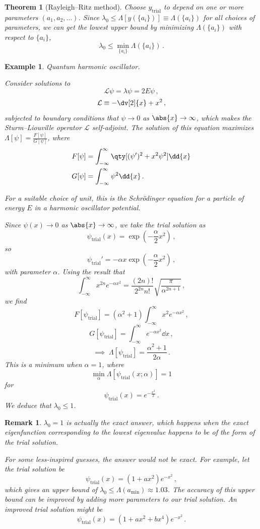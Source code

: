 \documentclass{article}
\theoremstyle{plain}\theoremheaderfont{\normalfont\itshape}\theorembodyfont{\rmfamily}\theoremseparator{.}\newtheorem*{rem}{Remark}\newtheorem*{ex}{Example}\newtheorem*{proof}{Proof}\newtheorem*{altp}{Alternative proof}
\theoremstyle{plain}\theoremheaderfont{\normalfont\bfseries}\theorembodyfont{\rmfamily}\theoremseparator{.}\newtheorem{thm}{Theorem}[section]\newtheorem{lem}[thm]{Lemma}\newtheorem{prop}[thm]{Proposition}\newtheorem*{cor}{Corollary}\newtheorem{defn}[thm]{Definition}\newtheorem{clm}[thm]{Claim}\newtheorem{clminproof}{Claim}
\theoremstyle{break}\theoremheaderfont{\normalfont\itshape}\theorembodyfont{\rmfamily}\theoremseparator{.\medskip}\newtheorem*{proofskip}{Proof}\newtheorem*{exs}{Examples}\newtheorem*{rems}{Remarks}
\theoremstyle{break}\theoremheaderfont{\normalfont\bfseries}\theorembodyfont{\rmfamily}\theoremseparator{.\medskip}\newtheorem{lemskip}[thm]{Lemma}\newtheorem{defnskip}[thm]{Definition}\newtheorem{propskip}[thm]{Proposition}\newtheorem{thmskip}[thm]{Theorem}
\numberwithin{equation}{section}
\begin{document}
	\begin{thm}[Rayleigh--Ritz method]		
		Choose \(y_\text{trial}\) to depend on one or more parameters \((a_1,a_2,\dots)\). Since \(\lambda_0\le\Lambda[y(\{a_i\})]\equiv\Lambda(\{a_i\})\) for all choices of parameters, we can get the lowest upper bound by minimizing \(\Lambda(\{a_i\})\) with respect to \(\{a_i\}\),
		\[\lambda_0\le\min\limits_{\{a_i\}}\Lambda(\{a_i\})\,.\]
	\end{thm}

	\begin{ex}
		\textit{Quantum harmonic oscillator.}
		
		Consider solutions to
		\[\mathcal{L}\psi=\lambda\psi=2E\psi\,,\]
		\[\mathcal{L}\equiv -\dv[2]{x}+x^2\,,\]
		subjected to boundary conditions that \(\psi\to 0\) as \(\abs{x}\to\infty\), which makes the Sturm--Liouville operator \(\mathcal{L}\) self-adjoint. The solution of this equation maximizes \(\Lambda[\psi]=\frac{F[\psi]}{G[\psi]}\), where
		\begin{align*}
			F[\psi]&=\int_{-\infty}^{\infty}\qty[(\psi')^2+x^2\psi^2]\dd{x}\\
			G[\psi]&=\int_{-\infty}^{\infty}\psi^2\dd{x}\,.
		\end{align*}

		For a suitable choice of unit, this is the Schr\"{o}dinger equation for a particle of energy \(E\) in a harmonic oscillator potential.

		Since \(\psi(x)\to 0\) as \(\abs{x}\to\infty\), we take the trial solution as
		\[\psi_\text{trial}(x)=\exp(-\frac{\alpha}{2}x^2)\,,\]
		so
		\[\psi_\text{trial}'=-\alpha x\exp(-\frac{\alpha}{2}x^2)\,,\]
		with parameter \(\alpha\). Using the result that
		\[\int_{-\infty}^{\infty}x^{2n}e^{-\alpha x^2}=\frac{(2n)!}{2^{2n}n!}\sqrt{\frac{\pi}{\alpha^{2n+1}}}\,,\]
		we find
		\[F[\psi_\text{trial}]=(\alpha^2+1)\int_{-\infty}^{\infty}x^2e^{-\alpha x^2}\,,\]
		\[G[\psi_\text{trial}]=\int_{-\infty}^{\infty}e^{-\alpha x^2}\dd{x}\,,\]
		\[\implies\; \Lambda[\psi_\text{trial}]=\frac{\alpha^2+1}{2\alpha}\,.\]
		This is a minimum when \(\alpha=1\), where
		\[\min\limits_{\alpha}\Lambda[\psi_\text{trial}(x;\alpha)]=1\]
		for
		\[\psi_\text{trial}(x)=e^{-\frac{x^2}{2}}\,.\]
		We deduce that \(\lambda_0\le 1\).
	\end{ex}
	\begin{rem}
		\(\lambda_0=1\) is actually the exact answer, which happens when the exact eigenfunction corresponding to the lowest eigenvalue happens to be of the form of the trial solution.
		
		For some less-inspired guesses, the answer would not be exact. For example, let the trial solution be
		\[\psi_\text{trial}(x)=(1+ax^2)e^{-x^2}\,,\]
		which gives an upper bound of \(\lambda_0\le\Lambda(a_\text{min})\approx 1.03\). The accuracy of this upper bound can be improved by adding more parameters to our trial solution. An improved trial solution might be
		\[\psi_\text{trial}(x)=(1+ax^2+bx^4)e^{-x^2}\,.\]
	\end{rem}
\end{document}
